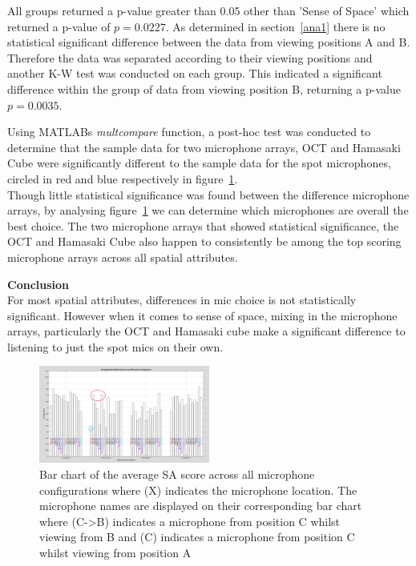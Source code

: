 \documentclass{aes2e}
\begin{document}
		All groups returned a p-value greater than 0.05 other than 'Sense of Space' which returned a p-value of $p = 0.0227 $. As determined in section~\ref{ana1} there is no statistical significant difference between the data from viewing positions A and B. Therefore the data was separated according to their viewing positions and another K-W test was conducted on each group. This indicated a significant difference within the group of data from viewing position B, returning a p-value $ p = 0.0035 $.

		Using MATLABs \textit{multcompare} function, a post-hoc test was conducted to determine that the sample data for two microphone arrays, OCT and Hamasaki Cube were significantly different to the sample data for the spot microphones, circled in red and blue respectively in figure~\ref{image:sa_allmics}. \\

		Though little statistical significance was found between the difference microphone arrays, by analysing figure~\ref{image:sa_allmics} we can determine which microphones are overall the best choice. The two microphone arrays that showed statistical significance, the OCT and Hamasaki Cube also happen to consistently be among the top scoring microphone arrays across all spatial attributes.

		\textbf{Conclusion} \\

		For most spatial attributes, differences in mic choice is not statistically significant. However when it comes to sense of space, mixing in the microphone arrays, particularly the OCT and Hamasaki cube make a significant difference to listening to just the spot mics on their own.

		\begin{figure}
			\includegraphics[width=0.5\textwidth]{images/plots/allMics_edit.PNG}
			\caption{Bar chart of the average SA score across all microphone configurations where (X) indicates the microphone location. The microphone names are displayed on their corresponding bar chart where (C->B) indicates a microphone from position C whilst viewing from B and (C) indicates a microphone from position C whilst viewing from position A}
			\label{image:sa_allmics} 
		\end{figure}
\end{document}
